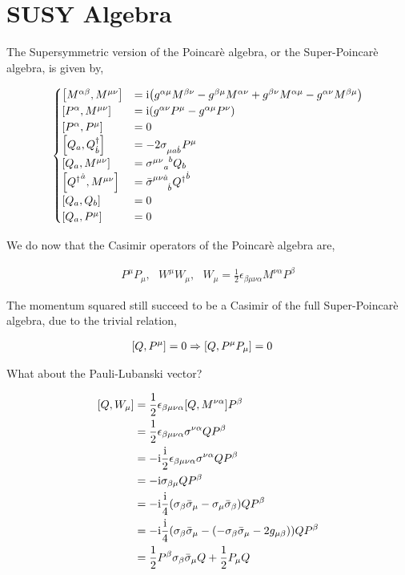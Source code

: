 \section{SUSY Algebra}

The Supersymmetric version of the Poincarè algebra, or the Super-Poincarè algebra, is given by,

\begin{align}
    \begin{cases}
        \comm{M^{\alpha\beta}}{M^{\mu\nu}}&=\im\qty(g^{\alpha\mu}M^{\beta\nu}-g^{\beta\mu}M^{\alpha\nu}+g^{\beta\nu}M^{\alpha\mu}-g^{\alpha\nu}M^{\beta\mu})\\
        \comm{P^\alpha}{M^{\mu\nu}}&=\im\qty(g^{\alpha\nu}P^\mu-g^{\alpha\mu}P^{\nu})\\
        \comm{P^\alpha}{P^\mu}&=0\\
        \comm{Q_a}{Q^\dagger_{\dot b}}&=-2\tensor{\sigma}{_\mu_{a}_{\dot b}}P^\mu\\
        \comm{Q_a}{M^{\mu\nu}}&=\tensor{{\sigma^{\mu\nu}}}{_a^b}Q_b\\
        \comm{{Q^\dagger}^{\dot a}}{M^{\mu\nu}}&=\tensor{{\bar\sigma}}{^\mu^\nu^{\dot a}_{\dot b}}{Q^\dagger}^{\dot b}\\
        \comm{Q_a}{Q_b}&=0\\
        \comm{Q_a}{P^\mu}&=0
    \end{cases}\nonumber
\end{align}

We do now that the Casimir operators of the Poincarè algebra are,

\begin{align}
    P^\mu P_\mu, \ \ \ W^\mu W_\mu,\ \ \ W_\mu=\frac12\epsilon_{\beta\mu\nu\alpha}M^{\nu\alpha}P^\beta\nonumber
\end{align}

The momentum squared still succeed to be a Casimir of the full Super-Poincarè algebra, due to the trivial relation,

\begin{align}
    \comm{Q}{P^\mu}&=0\Rightarrow \comm{Q}{P^\mu P_\mu}=0\nonumber
\end{align}

What about the Pauli-Lubanski vector?

\begin{align}
    \comm{Q}{W_\mu}&=\frac12\epsilon_{\beta\mu\nu\alpha}\comm{Q}{M^{\nu\alpha}}P^\beta\nonumber\\
    &=\frac12\epsilon_{\beta\mu\nu\alpha}\sigma^{\nu\alpha}QP^\beta\nonumber\\
    &=-\im\frac\im2\epsilon_{\beta\mu\nu\alpha}\sigma^{\nu\alpha}QP^\beta\nonumber\\
    &=-\im\sigma_{\beta\mu}QP^\beta\nonumber\\
    &=-\im\frac\im4\qty(\sigma_\beta{\bar\sigma}_\mu-\sigma_\mu{\bar\sigma}_\beta)QP^\beta\nonumber\\
    &=-\im\frac\im4\qty(\sigma_\beta{\bar\sigma}_\mu-\qty(-\sigma_\beta{\bar\sigma}_\mu-2g_{\mu\beta}))QP^\beta\nonumber\\
    &=\frac12P^\beta\sigma_\beta{\bar\sigma}_\mu Q+\frac12 P_\mu Q\nonumber
\end{align}

